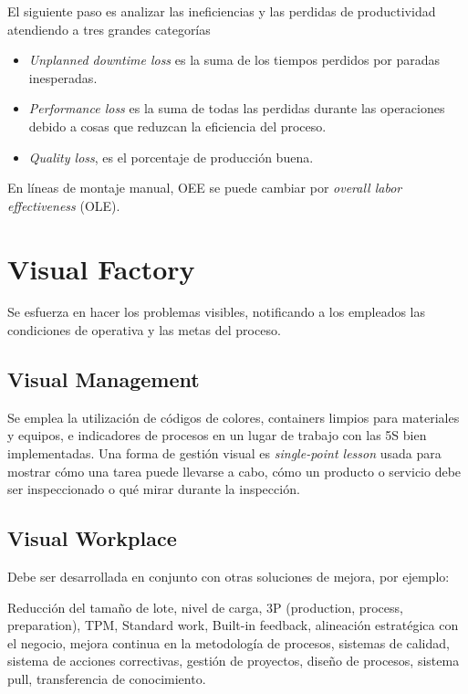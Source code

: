 \documentclass[oneside]{book}
\begin{document}
El siguiente paso es analizar las ineficiencias y las perdidas de productividad atendiendo a tres grandes categorías

\begin{itemize}
	\item \textit{Unplanned downtime loss} es la suma de los tiempos perdidos por paradas inesperadas. 
	\item \textit{Performance loss} es la suma de todas las perdidas durante las operaciones debido a cosas que reduzcan la eficiencia del proceso.
	\item \textit{Quality loss}, es el porcentaje de producción buena.
\end{itemize}

En líneas de montaje manual, OEE se puede cambiar por \textit{overall labor effectiveness} (OLE).

\section{Visual Factory}

Se esfuerza en hacer los problemas visibles, notificando a los empleados las condiciones de operativa y las metas del proceso.

\subsection{Visual Management}

Se emplea la utilización de códigos de colores, containers limpios para materiales y equipos, e indicadores de procesos en un lugar de trabajo con las 5S bien implementadas. Una forma de gestión visual es \textit{single-point lesson} usada para mostrar cómo una tarea puede llevarse a cabo, cómo un producto o servicio debe ser inspeccionado o qué mirar durante la inspección.

\subsection{Visual Workplace}

Debe ser desarrollada en conjunto con otras soluciones de mejora, por ejemplo:

Reducción del tamaño de lote, nivel de carga, 3P (production, process, preparation), TPM, Standard work, Built-in feedback, alineación estratégica con el negocio, mejora continua en la metodología de procesos, sistemas de calidad, sistema de acciones correctivas, gestión de proyectos, diseño de procesos, sistema pull, transferencia de conocimiento.
\end{document}
